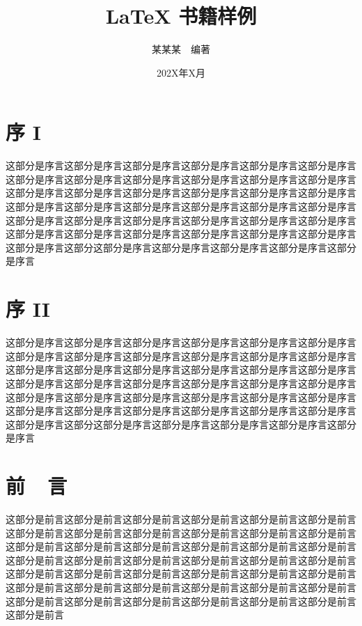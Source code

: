 \documentclass[openany,twoside,12pt]{book}
\title{\bfseries LaTeX 书籍样例}
\author{\fangsong 某某某~~编著}
\date{\fangsong 202X年X月}
\theoremstyle{plain}
\begin{document}
\maketitle  %

\thispagestyle{empty}



\frontmatter   %



\chapter{序 I}

这部分是序言这部分是序言这部分是序言这部分是序言这部分是序言这部分是序言这部分是序言这部分是序言这部分是序言这部分是序言这部分是序言这部分是序言这部分是序言这部分是序言这部分是序言这部分是序言这部分是序言这部分是序言这部分是序言这部分是序言这部分是序言这部分是序言这部分是序言这部分是序言这部分是序言这部分是序言这部分是序言这部分是序言这部分是序言这部分是序言这部分是序言这部分是序言这部分是序言这部分是序言这部分是序言这部分是序言这部分是序言这部分这部分是序言这部分是序言这部分是序言这部分是序言这部分是序言


\chapter{序 II}

这部分是序言这部分是序言这部分是序言这部分是序言这部分是序言这部分是序言这部分是序言这部分是序言这部分是序言这部分是序言这部分是序言这部分是序言这部分是序言这部分是序言这部分是序言这部分是序言这部分是序言这部分是序言这部分是序言这部分是序言这部分是序言这部分是序言这部分是序言这部分是序言这部分是序言这部分是序言这部分是序言这部分是序言这部分是序言这部分是序言这部分是序言这部分是序言这部分是序言这部分是序言这部分是序言这部分是序言这部分是序言这部分这部分是序言这部分是序言这部分是序言这部分是序言这部分是序言

\chapter{前~~言}

这部分是前言这部分是前言这部分是前言这部分是前言这部分是前言这部分是前言这部分是前言这部分是前言这部分是前言这部分是前言这部分是前言这部分是前言这部分是前言这部分是前言这部分是前言这部分是前言这部分是前言这部分是前言这部分是前言这部分是前言这部分是前言这部分是前言这部分是前言这部分是前言这部分是前言这部分是前言这部分是前言这部分是前言这部分是前言这部分是前言这部分是前言这部分是前言这部分是前言这部分是前言这部分是前言这部分是前言这部分是前言这部分是前言这部分是前言这部分是前言这部分是前言这部分是前言这部分是前言
\end{document}
